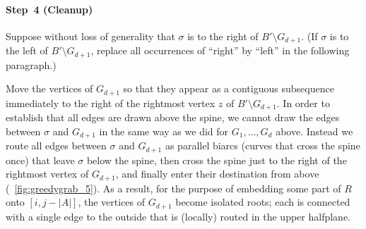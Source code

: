 \documentclass[11pt,a4paper,colorlinks=true,urlcolor=blue,citecolor=red]{article}
\theoremstyle{plain}
\newcommand{\subsubparagraph}[1]{\paragraph{#1}}
\begin{document}
\subsubparagraph{Step~4 (Cleanup)} Suppose without loss of generality
that $\sigma$ is to the right of $B'\setminus G_{d+1}$. (If $\sigma$ is
to the left of $B'\setminus G_{d+1}$, replace all occurrences of
``right'' by ``left'' in the following paragraph.)

Move the vertices of $G_{d+1}$ so that they appear as a contiguous
subsequence immediately to the right of the rightmost vertex $z$ of
$B'\setminus G_{d+1}$. In order to establish that all edges are drawn
above the spine, we cannot draw the edges between $\sigma$ and $G_{d+1}$
in the same way as we did for $G_1,\ldots,G_d$ above. Instead we route
all edges between $\sigma$ and $G_{d+1}$ as parallel biarcs (curves that
cross the spine once) that leave $\sigma$ below the spine, then cross
the spine just to the right of the rightmost vertex of $G_{d+1}$, and
finally enter their destination from above
(\figurename~\ref{fig:greedygrab_5}). As a result, for the purpose of
embedding some part of $R$ onto $[i,j-|A|]$, the vertices of $G_{d+1}$
become isolated roots; each is connected with a single edge to the
outside that is (locally) routed in the upper halfplane.
\end{document}
